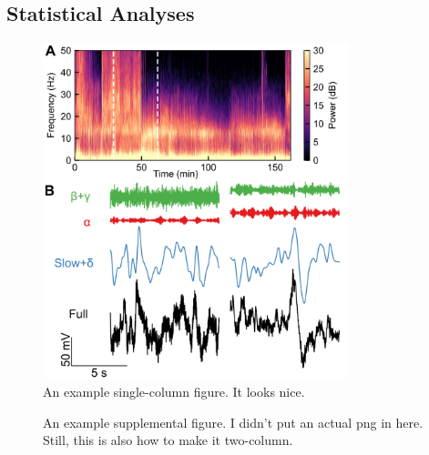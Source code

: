 \documentclass[10pt, letterpaper]{article}
\newcommand{\beginsupplement}{%
        \setcounter{table}{0}
        \renewcommand{\thetable}{S\arabic{table}}%
        \setcounter{figure}{0}
        \renewcommand{\thefigure}{S\arabic{figure}}%
     }
\begin{document}
\subsection{Statistical Analyses}

\clearpage




\clearpage

\begin{figure}
\begin{center}
\includegraphics[width=3.5in]{fig1}
\end{center}
\captionsetup{width=3.5in}
\caption{
\label{fig:fig1} An example single-column figure. It looks nice.}
\end{figure}

\beginsupplement

\begin{figure}
  \begin{center}
    \end{center}
    \captionsetup{width=7in}
    \caption{\label{fig:s1} An example supplemental figure. I didn't put an actual png in here. Still, this is also how to make it two-column.}
\end{figure}
\end{document}
